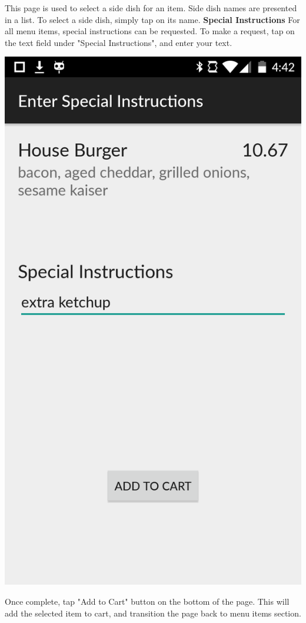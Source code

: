 \documentclass[12pt, titlepage]{article}
\begin{document}
This page is used to select a side dish for an item. Side dish names are presented in a list. To select a side dish, simply tap on its name.\pagebreak \newline
\textbf{Special Instructions}\newline
For all menu items, special instructions can be requested. To make a request, tap on the text field under "Special Instructions", and enter your text. 
\begin{center}\includegraphics[scale=0.15]{instructions.png}\end{center}
Once complete, tap "Add to Cart" button on the bottom of the page. This will add the selected item to cart, and transition the page back to menu items section. 
\end{document}

